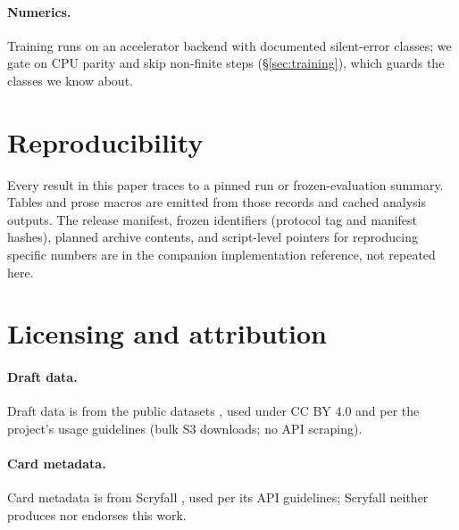 \paragraph{Numerics.}
Training runs on an accelerator backend with documented silent-error
classes; we gate on CPU parity and skip non-finite steps
(\S\ref{sec:training}), which guards the classes we know about.

\section{Reproducibility}
\label{sec:repro}

Every result in this paper traces to a pinned run or frozen-evaluation
summary. Tables and prose macros are emitted from those records and cached
analysis outputs. The release manifest, frozen identifiers (protocol tag
and manifest hashes), planned archive contents, and script-level pointers
for reproducing specific numbers are in the companion implementation
reference, not repeated here.

\section{Licensing and attribution}
\label{sec:licensing}

\paragraph{Draft data.}
Draft data is from the \seventeenlands{} public datasets
\citep{seventeenlands}, used under CC BY 4.0 and per the project's usage
guidelines (bulk S3 downloads; no API scraping).

\paragraph{Card metadata.}
Card metadata is from Scryfall \citep{scryfall}, used per its API
guidelines; Scryfall neither produces nor endorses this work.

